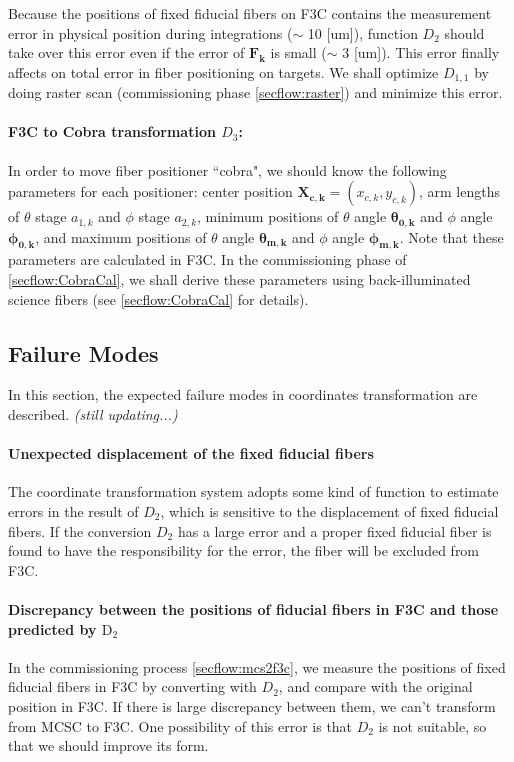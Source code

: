 Because the positions of fixed fiducial fibers on F3C contains the measurement error in physical position during integrations ($\sim$ 10 [um]),  function  $D_2$ should take over this error even if the error of $\bm{F_k}$ is small ($\sim$ 3 [um]).
This error finally affects on total error in fiber positioning on targets.
We shall optimize $D_{1,1}$ by doing raster scan (commissioning phase \ref{secflow:raster}) and minimize this error.

\paragraph{F3C to Cobra transformation $D_3$:}
In order to move fiber positioner ``cobra", we should know the following parameters for each positioner: center position $\bm{X_{c,k}}=(x_{c,k}, y_{c,k})$, arm lengths of $\theta$ stage $a_{1,k}$ and $\phi$ stage $a_{2,k}$, minimum positions of $\theta$ angle $\bm{\theta _{0,k}}$ and $\phi$ angle $\bm{\phi _{0,k}}$, and maximum positions of $\theta$ angle $\bm{\theta _{m,k}}$ and $\phi$ angle $\bm{\phi_{m,k}}$.
Note that these parameters are calculated in F3C.
In the commissioning phase of \ref{secflow:CobraCal}, we shall derive these parameters using back-illuminated science fibers (see \ref{secflow:CobraCal} for details).

\subsection{Failure Modes}\label{sec:failures}
In this section, the expected failure modes in coordinates transformation are described.
{\it (still updating...)}

\paragraph{Unexpected displacement of the fixed fiducial fibers}
The coordinate transformation system adopts some kind of function to estimate errors in the result of $D_2$, which is sensitive to the displacement of fixed fiducial fibers.
If the conversion $D_2$ has a large error and a proper fixed fiducial fiber is found to have the responsibility for the error, the fiber will be excluded from F3C.

\paragraph{Discrepancy between the positions of fiducial fibers in F3C and those predicted by $\mathrm{D_2}$}
In the commissioning process \ref{secflow:mcs2f3c}, we measure the positions of fixed fiducial fibers in F3C by converting with $D_2$, and compare with the original position in F3C.
If there is large discrepancy between them, we can't transform from MCSC to F3C.
One possibility of this error is that $D_2$ is not suitable, so that we should improve its form.


